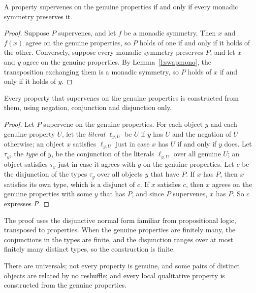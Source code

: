 \documentclass{situationist-preprint}
\begin{document}
\begin{proposition}\label{p:iff}
A property supervenes on the genuine properties if and only if every monadic symmetry preserves it.
\end{proposition}

\begin{proof}
Suppose $P$ supervenes, and let $f$ be a monadic symmetry. Then $x$ and $f(x)$ agree on the genuine properties, so $P$ holds of one if and only if it holds of the other. Conversely, suppose every monadic symmetry preserves $P$, and let $x$ and $y$ agree on the genuine properties. By Lemma~\ref{l:swapmono}, the transposition exchanging them is a monadic symmetry, so $P$ holds of $x$ if and only if it holds of $y$.
\end{proof}

\begin{theorem}[Construction]\label{t:construct}
Every property that supervenes on the genuine properties is constructed from them, using negation, conjunction and disjunction only.
\end{theorem}

\begin{proof}
Let $P$ supervene on the genuine properties. For each object $y$ and each genuine property $U$, let the \emph{literal} $\ell_{y,U}$ be $U$ if $y$ has $U$ and the negation of $U$ otherwise; an object $x$ satisfies $\ell_{y,U}$ just in case $x$ has $U$ if and only if $y$ does. Let $\tau_y$, the \emph{type} of $y$, be the conjunction of the literals $\ell_{y,U}$ over all genuine $U$; an object satisfies $\tau_y$ just in case it agrees with $y$ on the genuine properties. Let $c$ be the disjunction of the types $\tau_y$ over all objects $y$ that have $P$. If $x$ has $P$, then $x$ satisfies its own type, which is a disjunct of $c$. If $x$ satisfies $c$, then $x$ agrees on the genuine properties with some $y$ that has $P$, and since $P$ supervenes, $x$ has $P$. So $c$ expresses $P$.
\end{proof}

The proof uses the disjunctive normal form familiar from propositional logic, transposed to properties. When the genuine properties are finitely many, the conjunctions in the types are finite, and the disjunction ranges over at most finitely many distinct types, so the construction is finite.

\begin{theorem}\label{t:main}
There are universals; not every property is genuine, and some pairs of distinct objects are related by no reshuffle; and every local qualitative property is constructed from the genuine properties.
\end{theorem}
\end{document}
